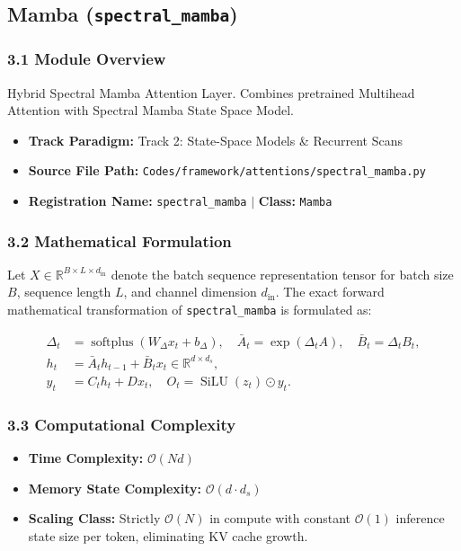 \subsection{Mamba (\texttt{spectral\_mamba})}
\label{sec:app_module_spectral_mamba}

\subsubsection*{3.1 Module Overview}
Hybrid Spectral Mamba Attention Layer. Combines pretrained Multihead Attention with Spectral Mamba State Space Model.
\begin{itemize}
    \item \textbf{Track Paradigm:} Track 2: State-Space Models \& Recurrent Scans
    \item \textbf{Source File Path:} \texttt{Codes/framework/attentions/spectral\_mamba.py}
    \item \textbf{Registration Name:} \texttt{spectral\_mamba} $\mid$ \textbf{Class:} \texttt{Mamba}
\end{itemize}

\subsubsection*{3.2 Mathematical Formulation}
Let $X \in \mathbb{R}^{B \times L \times d_{\text{in}}}$ denote the batch sequence representation tensor for batch size $B$, sequence length $L$, and channel dimension $d_{\text{in}}$. The exact forward mathematical transformation of \texttt{spectral\_mamba} is formulated as:

\begin{align}
\Delta_t &= \operatorname{softplus}(W_\Delta x_t + b_\Delta), \quad \bar{A}_t = \exp(\Delta_t A), \quad \bar{B}_t = \Delta_t B_t, \\
h_t &= \bar{A}_t h_{t-1} + \bar{B}_t x_t \in \mathbb{R}^{d \times d_s}, \\
y_t &= C_t h_t + D x_t, \quad O_t = \operatorname{SiLU}(z_t) \odot y_t.
\end{align}


\subsubsection*{3.3 Computational Complexity}
\begin{itemize}
    \item \textbf{Time Complexity:} $\mathcal{O}(N d)$
    \item \textbf{Memory State Complexity:} $\mathcal{O}(d \cdot d_s)$
    \item \textbf{Scaling Class:} Strictly $\mathcal{O}(N)$ in compute with constant $\mathcal{O}(1)$ inference state size per token, eliminating KV cache growth.
\end{itemize}

